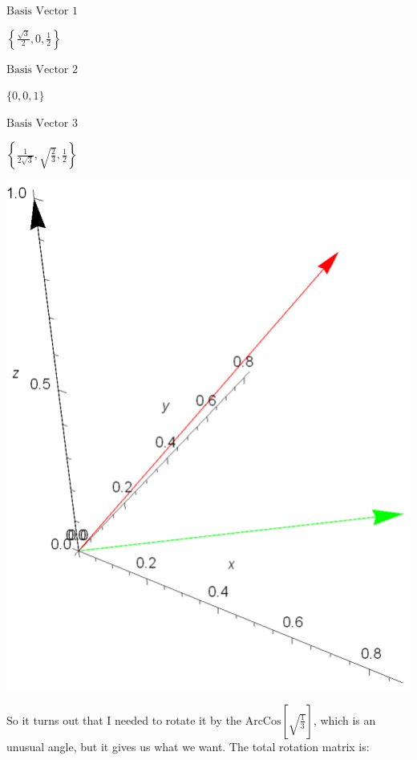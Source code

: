 \documentclass{article}
\begin{document}
\noindent\(\text{Basis Vector 1}\)

\begin{doublespace}
\noindent\(\left\{\frac{\sqrt{3}}{2},0,\frac{1}{2}\right\}\)
\end{doublespace}

\noindent\(\text{Basis Vector 2}\)

\begin{doublespace}
\noindent\(\{0,0,1\}\)
\end{doublespace}

\noindent\(\text{Basis Vector 3}\)

\begin{doublespace}
\noindent\(\left\{\frac{1}{2 \sqrt{3}},\sqrt{\frac{2}{3}},\frac{1}{2}\right\}\)
\end{doublespace}

\includegraphics{3D_tiling_gr3.eps}

So it turns out that I needed to rotate it by the \(\text{ArcCos}\left[\sqrt{\frac{1}{3}}\right]\), which is an unusual angle, but it gives us what
we want. The total rotation matrix is:
\end{document}
